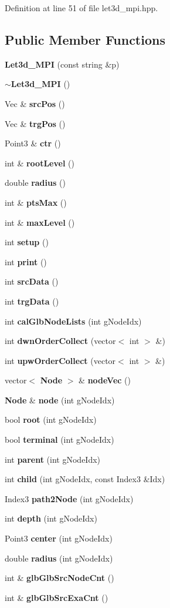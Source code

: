 Definition at line 51 of file let3d\_\-mpi.hpp.\subsection*{Public Member Functions}
\begin{CompactItemize}
\item 
{\bf Let3d\_\-MPI} (const string \&p)
\item 
{\bf $\sim$Let3d\_\-MPI} ()
\item 
Vec \& {\bf src\-Pos} ()
\item 
Vec \& {\bf trg\-Pos} ()
\item 
Point3 \& {\bf ctr} ()
\item 
int \& {\bf root\-Level} ()
\item 
double {\bf radius} ()
\item 
int \& {\bf pts\-Max} ()
\item 
int \& {\bf max\-Level} ()
\item 
int {\bf setup} ()
\item 
int {\bf print} ()
\item 
int {\bf src\-Data} ()
\item 
int {\bf trg\-Data} ()
\item 
int {\bf cal\-Glb\-Node\-Lists} (int g\-Node\-Idx)
\item 
int {\bf dwn\-Order\-Collect} (vector$<$ int $>$ \&)
\item 
int {\bf upw\-Order\-Collect} (vector$<$ int $>$ \&)
\item 
vector$<$ {\bf Node} $>$ \& {\bf node\-Vec} ()
\item 
{\bf Node} \& {\bf node} (int g\-Node\-Idx)
\item 
bool {\bf root} (int g\-Node\-Idx)
\item 
bool {\bf terminal} (int g\-Node\-Idx)
\item 
int {\bf parent} (int g\-Node\-Idx)
\item 
int {\bf child} (int g\-Node\-Idx, const Index3 \&Idx)
\item 
Index3 {\bf path2Node} (int g\-Node\-Idx)
\item 
int {\bf depth} (int g\-Node\-Idx)
\item 
Point3 {\bf center} (int g\-Node\-Idx)
\item 
double {\bf radius} (int g\-Node\-Idx)
\item 
int \& {\bf glb\-Glb\-Src\-Node\-Cnt} ()
\item 
int \& {\bf glb\-Glb\-Src\-Exa\-Cnt} ()
\item 

\end{CompactItemize}
